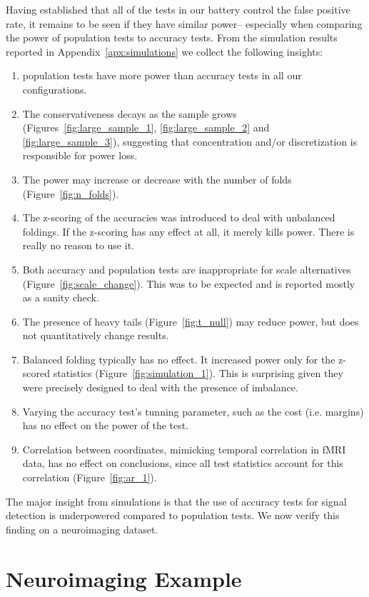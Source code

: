 \documentclass[12pt,a4paper]{article}
\theoremstyle{definition}
\begin{document}
Having established that all of the tests in our battery control the false positive rate, it remains to be seen if they have similar power-- 
especially when comparing the power of population tests to accuracy tests. 
From the simulation results reported in Appendix~\ref{apx:simulations} we collect the following insights:
\begin{enumerate}
\item population tests have more power than accuracy tests in all our configurations.
\item The conservativeness decays as the sample grows (Figures~\ref{fig:large_sample_1}, \ref{fig:large_sample_2} and \ref{fig:large_sample_3}), suggesting that concentration and\slash or discretization is responsible for power loss. 
\item The power may increase or decrease with the number of folds (Figure~\ref{fig:n_folds}). %
\item The z-scoring of the accuracies was introduced to deal with unbalanced foldings. 
If the z-scoring has any effect at all, it merely kills power.
There is really no reason to use it. 
\item Both accuracy and population tests are inappropriate for scale alternatives (Figure~\ref{fig:scale_change}). 
This was to be expected and is reported mostly as a sanity check.
\item The presence of heavy tails (Figure~\ref{fig:t_null}) may reduce power, but does not quantitatively change results. 
\item Balanced folding typically has no effect. 
It increased power only for the z-scored statistics (Figure~\ref{fig:simulation_1}). This is surprising given they were precisely designed to deal with the presence of imbalance. 
\item Varying the accuracy test's tunning parameter, such as the cost (i.e. margins) has no effect on the power of the test. 
\item Correlation between coordinates, mimicking temporal correlation in fMRI data, has no effect on conclusions, since all test statistics account for this correlation (Figure~\ref{fig:ar_1}).
\end{enumerate}


The major insight from simulations is that the use of accuracy tests for signal detection is underpowered compared to population tests. 
We now verify this finding on a neuroimaging dataset.



\section{Neuroimaging Example}
\label{sec:example}
\end{document}
